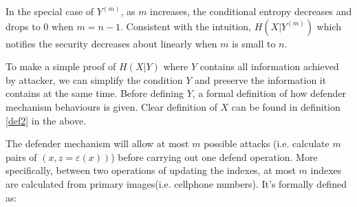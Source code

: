 \documentclass[10pt, conference, compsocconf]{IEEEtran}
\begin{document}
        In the special case of $Y^{(m)}$, as $m$ increases,
        the conditional entropy decreases and drops to $0$ when $m = n-1$.
        Consistent with the intuition, $H(X | Y^{(m)})$ which notifies the security decreases about linearly when $m$ is small
        to $n$.

        To make a simple proof of $H(X | Y)$ where $Y$ contains
        all information achieved by attacker, we can simplify the
        condition $Y$ and preserve the information it contains
        at the same time. Before defining $Y$, a
        formal definition of how defender mechanism behaviours is given. Clear
        definition of $X$ can be found in definition \ref{def2} in the above.

        The defender mechanism will allow at most $m$ possible
        attacks (i.e. calculate $m$ pairs of $\left(x, z = \varepsilon(x)\right)$)
        before carrying out one defend operation. More specifically, between
        two operations of updating the indexes,
        at most $m$ indexes are calculated from primary images(i.e. cellphone numbers).
        It's formally defined as:
\end{document}
